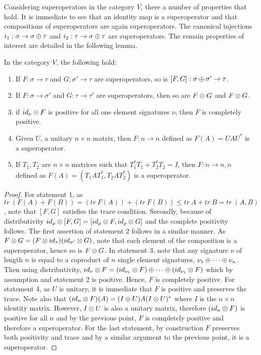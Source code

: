 Considering superoperators in the category $V$, there a number of properties that hold. It is
immediate to see that an identity map is a superoperator and that compositions of superoperators
are again superoperators. The canonical injections $i_{1}:\sigma\to \sigma\oplus\tau$ and
$i_{2}:\tau\to \sigma\oplus\tau$ are superoperators. The remain properties of interest are detailed in
the following lemma.
\begin{lemma}\label{lemma:superoperator}
In the category $V$, the following hold:
\begin{enumerate}
  \item  If $F:\sigma\to\tau$ and $G:\sigma'\to\tau$ are superoperators, so is
  $[F,G]:\sigma\oplus\sigma'\to\tau$.
  \item If $F:\sigma\to\sigma'$ and $G:\tau\to\tau'$ are superoperators, then so are $F\oplus G$ and
    $F\otimes G$.
  \item if $id_{\nu}\otimes F$ is positive for all one element signatures $\nu$, then $F$ is completely
    positive.
  \item Given $U$, a unitary $n\times n$ matrix, then $F:n \to n$ defined as $F(A) = UAU^{*}$ is a
    superoperator.
  \item If $T_{1},T_{2}$ are $n\times n$ matrices such that $T_{1}^{*}T_{1} + T_{2}^{*}T_{2} = I$,
    then $F:n\to n,n$ defined as $F(A) = (T_{1}AT_{1}^{*}, T_{2}AT_{2}^{*})$ is a superoperator.
\end{enumerate}
\end{lemma}
\begin{proof}
  For statement 1, as $tr\ (F(A)+F(B)) = (tr\ F(A))+(tr\ F(B)) \le tr\ A + tr\ B = tr\ (A,B)$, note
  that $[F,G]$ satisfies the trace condition. Secondly, because of distributivity $id_{\rho}\otimes[F,G]
  = [id_{\rho}\otimes F,id_{\rho}\otimes G]$ and the complete positivity follows. The first assertion of
  statement 2 follows in a similar manner. As $F\otimes G = (F\otimes id_{\tau}) (id_{\sigma'}\otimes G)$, note that
  each element of the composition is a superoperator, hence so is $F\otimes G$. In statement 3, note that
  any signature $\nu$ of length $n$ is equal to a coproduct of $n$ single element signatures,
  $\nu_{1}\oplus\cdots\oplus\nu_{n}$. Then using distributivity, $id_{\nu}\otimes F = (id_{\nu_{1}}\otimes F)\oplus\cdots\oplus
  (id_{\nu_{1}}\otimes F)$ which by assumption and statement 2 is positive. Hence, $F$ is completely
  positive. For statement 4, as $U$ is unitary, it is immediate that $F$ is positive and preserves
  the trace. Note also that $(id_{n} \otimes F)(A) = (I\otimes U)A(I\otimes U)^{*}$ where $I$ is the $n\times n$
  identity matrix. However, $I\otimes U$ is also a unitary matrix, therefore $(id_{n} \otimes F)$ is positive
  for all $n$ and by the previous point, $F$ is completely positive and therefore a superoperator.
  For the last statement, by construction $F$ preserves both positivity and trace and by a similar
  argument to the previous point, it is a superoperator.
\end{proof}


